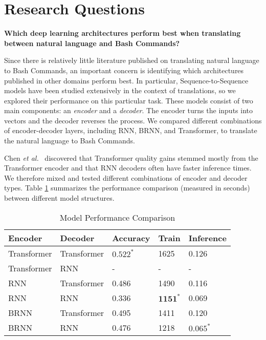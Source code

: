 \documentclass{river-journal}
\begin{document}
\section{Research Questions}
\label{methodology}
\textbf{Which deep learning architectures perform best when translating between natural language and Bash Commands?} 

Since there is relatively little literature published on translating natural language to Bash Commands, an important concern is identifying which architectures published in other domains perform best. In particular, 
Sequence-to-Sequence~\cite{Sutskever2014SequenceTS} models have been studied extensively in the context of translations, so we explored their performance on this particular task. These models consist of two main components: an \emph{encoder} and a \emph{decoder}. The encoder turns the inputs into vectors and the decoder reverses the process. We compared different combinations of encoder-decoder layers, including RNN, BRNN, and Transformer, to translate the natural language to Bash Commands.

Chen \textit{et al.}~\cite{Chen2018TheBO} discovered that Transformer quality gains stemmed mostly from the Transformer encoder and that RNN decoders often have faster inference times. We therefore mixed and tested different combinations of encoder and decoder types. Table \ref{table:models} summarizes the performance comparison (measured in seconds) between different model structures. 
\begin{table}[bhtp]
\caption{\label{table:models} Model Performance Comparison}
\centering
{
\begin{tabular}{lllll}
\hline \textbf{Encoder} & \textbf{Decoder} & \textbf{Accuracy}& \textbf{Train} & \textbf{Inference}
\\\hline
Transformer & Transformer & $\mathbf{0.522}^{*}$ & 1625 & 0.126 \\
Transformer & RNN & - & - & - \\
RNN & Transformer & 0.486 & 1490 & 0.116 \\
RNN & RNN & 0.336 & $\mathbf{1151}^{*}$ & 0.069 \\
BRNN & Transformer & 0.495 & 1411 & 0.120 \\
BRNN & RNN & 0.476 & 1218 & $\mathbf{0.065 }^{*}$\\
\hline
\end{tabular}}
\end{table}
\end{document}
